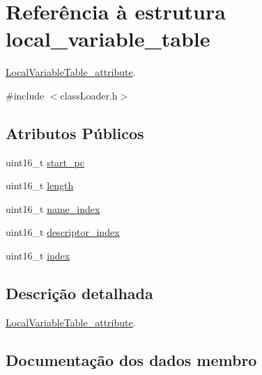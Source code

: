 \hypertarget{structlocal__variable__table}{}\section{Referência à estrutura local\+\_\+variable\+\_\+table}
\label{structlocal__variable__table}


\hyperlink{struct_local_variable_table__attribute}{Local\+Variable\+Table\+\_\+attribute}.  




{\ttfamily \#include $<$class\+Loader.\+h$>$}

\subsection*{Atributos Públicos}
\begin{DoxyCompactItemize}
\item 
uint16\+\_\+t \hyperlink{structlocal__variable__table_a5d32f4a50c3486c460b638e236bc8fbe}{start\+\_\+pc}
\item 
uint16\+\_\+t \hyperlink{structlocal__variable__table_a24bf85b7ea3a81ec85153173706aec55}{length}
\item 
uint16\+\_\+t \hyperlink{structlocal__variable__table_ae0c126d119eaace7f2393e173ea6fd2a}{name\+\_\+index}
\item 
uint16\+\_\+t \hyperlink{structlocal__variable__table_a30343321d79345b490098b0b6d98af98}{descriptor\+\_\+index}
\item 
uint16\+\_\+t \hyperlink{structlocal__variable__table_ad608d413d5436a35d55659d8a85fa6b0}{index}
\end{DoxyCompactItemize}


\subsection{Descrição detalhada}
\hyperlink{struct_local_variable_table__attribute}{Local\+Variable\+Table\+\_\+attribute}. 

\subsection{Documentação dos dados membro}
\hypertarget{structlocal__variable__table_a30343321d79345b490098b0b6d98af98}{}\label{structlocal__variable__table_a30343321d79345b490098b0b6d98af98} 
